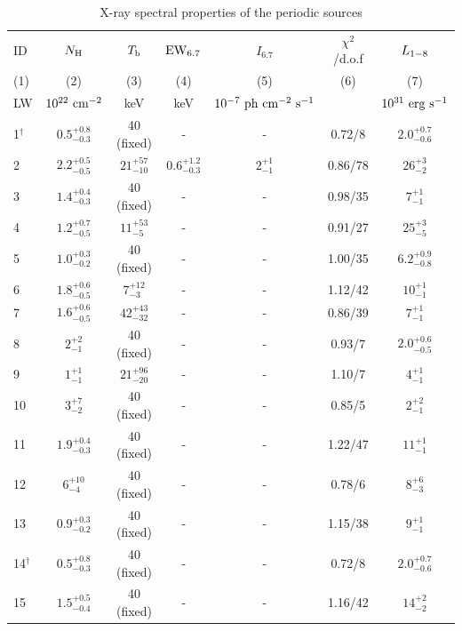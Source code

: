 \documentclass[fleqn,usenatbib]{mnras}
\begin{document}
\begin{table}
\centering
\begin{threeparttable}
\caption{X-ray spectral properties of the periodic sources \label{tab:spec}}
\begin{spacing}{1.19}

\begin{tabular}{lcccccc}
\hline
\hline
ID & $N_{\rm H}$ & $T_{\rm b}$ &  ${\rm EW}_{6.7}$ &$I_{6.7}$ & $\chi^2$/d.o.f & $L_{\rm 1-8}$ 
\\
(1) & (2) & (3) & (4) & (5) & (6) & (7)
\\
LW & $10^{22}\rm~cm^{-2}$ & keV & keV & $\rm 10^{-7}~ph~ cm^{-2}~s^{-1} $ & & $10^{31}\rm~erg~s^{-1}$ 
\\
\hline

1$^\dag$ & $0.5^{+0.8}_{-0.3}$ & 40 (fixed)  & - & - & 0.72/8  & $2.0^{+0.7}_{-0.6}$
\\
2 & $2.2^{+0.5}_{-0.5}$ & $21^{+57}_{-10}$ & $0.6^{+1.2}_{-0.3}$ & $2^{+1}_{-1}$ & 0.86/78  & $26^{+3}_{-2}$
\\
3 & $1.4^{+0.4}_{-0.3}$ & 40 (fixed) & - & - & 0.98/35  & $7^{+1}_{-1}$
\\
4 & $1.2^{+0.7}_{-0.5}$ & $11^{+53}_{-5}$ & - & - & 0.91/27  & $25^{+3}_{-5}$
\\
5 & $1.0^{+0.3}_{-0.2}$ & 40 (fixed) & - & -& 1.00/35 &  $6.2^{+0.9}_{-0.8}$
\\
6 & $1.8^{+0.6}_{-0.5}$ & $7^{+12}_{-3}$ 
	& - & -& 1.12/42 &  $10^{+1}_{-1}$
\\
7 & $1.6^{+0.6}_{-0.5}$ & $42^{+43}_{-32}$ & - &- & 0.86/39 &  $7 ^{+1}_{-1}$
\\
8 & $2^{+2}_{-1}$ & 40 (fixed) & - &- & 0.93/7 &  $2.0^{+0.6}_{-0.5}$
\\
9 & $1^{+1}_{-1}$ & $21^{+96}_{-20}$ & -  &- & 1.10/7 &  $4^{+1}_{-1}$
\\
10 & $3^{+7}_{-2}$ & 40 (fixed)  & - &- & 0.85/5 &  $2^{+2}_{-1}$
\\
11 & $1.9^{+0.4}_{-0.3}$ & 40 (fixed)  & - &- & 1.22/47 &  $11^{+1}_{-1}$
\\
12 & $6^{+10}_{-4}$ & 40 (fixed) &-&-& 0.78/6 &  $8^{+6}_{-3}$
\\
13 & $0.9^{+0.3}_{-0.2}$ & 40 (fixed) & - &- & 1.15/38 &  $9^{+1}_{-1}$
\\
14$^\dag$ & $0.5^{+0.8}_{-0.3}$ & 40 (fixed) & - &- &  0.72/8 &  $2.0^{+0.7}_{-0.6}$
\\
15 & $1.5^{+0.5}_{-0.4}$ & 40 (fixed) & - &- &  1.16/42 & $14^{+2}_{-2}$
\\

\end{tabular}
\end{spacing}
\end{threeparttable}
\end{table}
\end{document}
